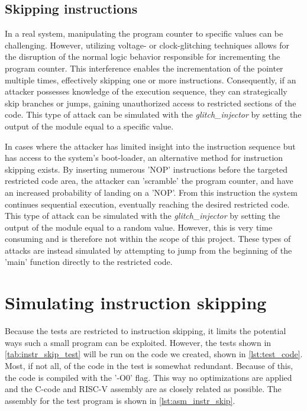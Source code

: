 \subsection{Skipping instructions}
\label{subsec:skip_instr}

In a real system, manipulating the program counter to specific values can be challenging. However, utilizing voltage- or clock-glitching techniques allows for the disruption of the normal logic behavior responsible for incrementing the program counter. This interference enables the incrementation of the pointer multiple times, effectively skipping one or more instructions. Consequently, if an attacker possesses knowledge of the execution sequence, they can strategically skip branches or jumps, gaining unauthorized access to restricted sections of the code. This type of attack can be simulated with the \textit{glitch\_injector} by setting the output of the module equal to a specific value. 

In cases where the attacker has limited insight into the instruction sequence but has access to the system's boot-loader, an alternative method for instruction skipping exists. By inserting numerous 'NOP' instructions before the targeted restricted code area, the attacker can 'scramble' the program counter, and have an increased probability of landing on a 'NOP'. From this instruction the system continues sequential execution, eventually reaching the desired restricted code. This type of attack can be simulated with the \textit{glitch\_injector} by setting the output of the module equal to a random value. However, this is very time consuming and is therefore not within the scope of this project. These types of attacks are instead simulated by attempting to jump from the beginning of the 'main' function directly to the restricted code. 

\section{Simulating instruction skipping}
\label{sec:sim_instr_skip}

Because the tests are restricted to instruction skipping, it limits the potential ways such a small program can be exploited. However, the tests shown in \autoref{tab:instr_skip_test} will be run on the code we created, shown in \autoref{lst:test_code}. Most, if not all, of the code in the test is somewhat redundant. Because of this, the code is compiled with the '-O0' flag. This way no optimizations are applied and the C-code and RISC-V assembly are as closely related as possible. The assembly for the test program is shown in \autoref{lst:asm_instr_skip}. 

